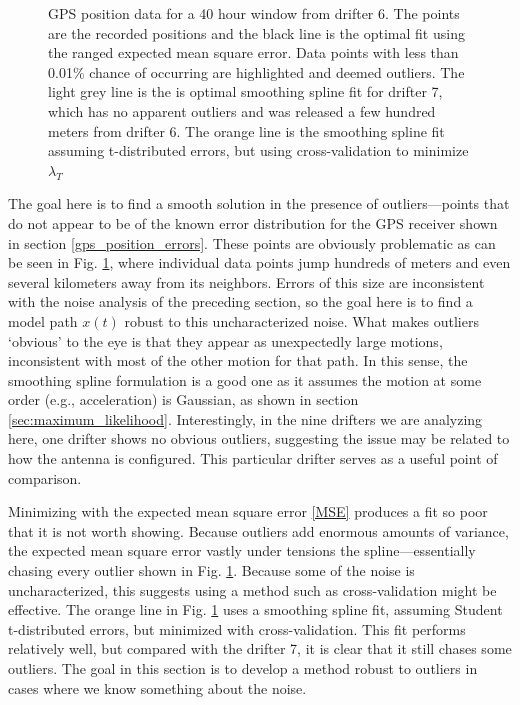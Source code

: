 \documentclass{ametsoc}
\begin{document}
\begin{figure}[t]
\begin{minipage}{0.7\textwidth}
    \end{minipage}
   \caption{GPS position data for a 40 hour window from drifter 6. The points are the recorded positions and the black line is the optimal fit using the ranged expected mean square error. Data points with less than 0.01\% chance of occurring are highlighted and deemed outliers. The light grey line is the is optimal smoothing spline fit for drifter 7, which has no apparent outliers and was released a few hundred meters from drifter 6. The orange line is the smoothing spline fit assuming t-distributed errors, but using cross-validation to minimize $\lambda_T$}
  \label{gpsfit}
\end{figure}

The goal here is to find a smooth solution in the presence of outliers---points that do not appear to be of the known error distribution for the GPS receiver shown in section \ref{gps_position_errors}. These points are obviously problematic as can be seen in Fig. \ref{gpsfit}, where individual data points jump hundreds of meters and even several kilometers away from its neighbors. Errors of this size are inconsistent with the noise analysis of the preceding section, so the goal here is to find a model path $x(t)$ robust to this uncharacterized noise. What makes outliers `obvious' to the eye is that they appear as unexpectedly large motions, inconsistent with most of the other motion for that path. In this sense, the smoothing spline formulation is a good one as it assumes the motion at some order (e.g., acceleration) is Gaussian, as shown in section \ref{sec:maximum_likelihood}. Interestingly, in the nine drifters we are analyzing here, one drifter shows no obvious outliers, suggesting the issue may be related to how the antenna is configured. This particular drifter serves as a useful point of comparison.

Minimizing with the expected mean square error \eqref{MSE} produces a fit so poor that it is not worth showing. Because outliers add enormous amounts of variance, the expected mean square error vastly under tensions the spline---essentially chasing every outlier shown in Fig. \ref{gpsfit}. Because some of the noise is uncharacterized, this suggests using a method such as cross-validation might be effective. The orange line in Fig. \ref{gpsfit} uses a smoothing spline fit, assuming Student t-distributed errors, but minimized with cross-validation. This fit performs relatively well, but compared with the drifter 7, it is clear that it still chases some outliers. The goal in this section is to develop a method robust to outliers in cases where we know something about the noise.
\end{document}

